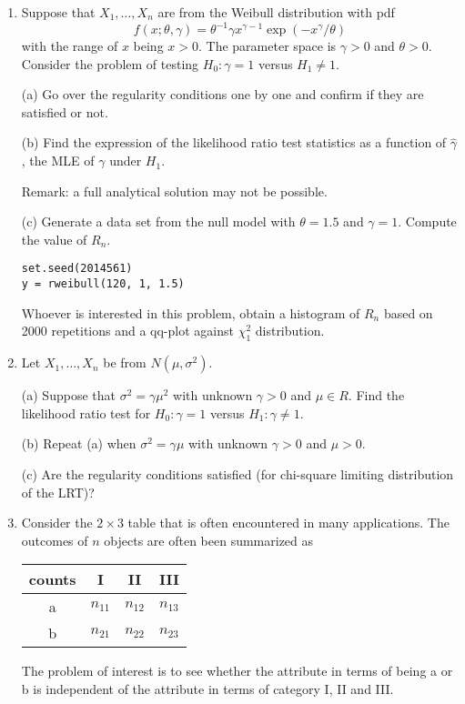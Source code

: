 \begin{enumerate}
\item
Suppose that $X_1, \ldots, X_n$ are \iid from the Weibull distribution with pdf
\[
f(x; \theta, \gamma) = \theta^{-1} \gamma x^{\gamma - 1} \exp( - x^\gamma /\theta)
\]
with the range of $x$ being $x > 0$. 
The parameter space is $\gamma > 0$ and $\theta > 0$.
Consider the problem of testing $H_0: \gamma = 1$ versus $H_1 \neq 1$.

(a) Go over the regularity conditions one by one and confirm 
if they are satisfied or not.

(b) Find the expression of the likelihood ratio test statistics
as a function of $\hat \gamma$, the MLE of $\gamma$ under $H_1$. 

Remark: a full analytical solution may not be possible.

(c) Generate a data set from the null model with $\theta = 1.5$ and $\gamma = 1$. 
Compute the value of $R_n$.
\begin{verbatim}
set.seed(2014561)
y = rweibull(120, 1, 1.5)
\end{verbatim}

Whoever is interested in this problem, obtain a histogram of $R_n$ based
on 2000 repetitions and a qq-plot against $\chi_1^2$ distribution. 

\item
Let $X_1, \ldots, X_n$ be \iid from $N(\mu, \sigma^2)$.

(a) Suppose that $\sigma^2 = \gamma \mu^2$ with unknown 
$\gamma > 0$ and $\mu \in R$.
Find the likelihood ratio test for $H_0: \gamma = 1$ versus $H_1: \gamma \neq 1$.

(b) Repeat (a) when $\sigma^2 = \gamma \mu$ with unknown $\gamma > 0$ and $\mu > 0$.

(c) Are the regularity conditions satisfied (for chi-square limiting distribution of the LRT)?


\item
Consider the $2\times 3$ table that is often encountered in
many applications. The outcomes of $n$ objects are often
been summarized as
\begin{center}
\begin{tabular}{|c|c|c|c|}
\hline
counts & I & II&  III \\
\hline 
a&$n_{11}$&$n_{12}$& $n_{13}$ \\
b&$n_{21}$&$n_{22}$& $n_{23}$ \\
\hline
\end{tabular}
\end{center}
The problem of interest is to see whether the attribute in terms of being
a or b is independent of the attribute in terms of category I, II and III.


\end{enumerate}
